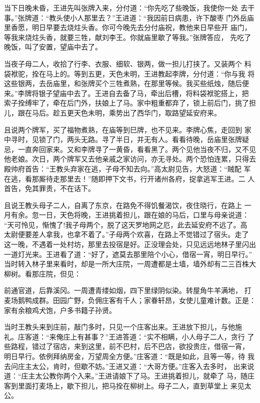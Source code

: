 当下日晚未昏，王进先叫张牌入来，分付道：“你先吃了些晚饭，我使你一处
去干事。”张牌道：“教头使小人那里去？”王进道：“我因前日病患，许下酸枣
门外岳庙里香愿，明日早要去烧炷头香。你可今晚先去分付庙祝，教他来日早些开
庙门，等我来烧炷头香，就要三牲，献刘李王。你就庙里歇了等我。”张牌答应，
先吃了晚饭，叫了安置，望庙中去了。

当夜子母二人，收拾了行李、衣服、细软、银两，做一担儿打挟了。又装两个
料袋袱驼，拴在马上的。等到五更，天色未明，王进教起李牌，分付道：“你与我
将这些银两，去岳庙里，和张牌买个三牲煮熟，在那里等候。我买些纸烛，随后便
来。”李牌将银子望庙中去了。王进自去备了马，牵出后槽，将料袋袱驼搭上，把
索子拴缚牢了，牵在后门外，扶娘上了马。家中粗重都弃了，锁上前后门，挑了担
儿，跟在马后。趁五更天色未明，乘势出了西华门，取路望延安府来。

且说两个牌军，买了福物煮熟，在庙等到巳牌，也不见来。李牌心焦，走回到
家中寻时，见锁了门，两头无路。寻了半日，并无有人。看看待晚，岳庙里张牌疑
忌，一直奔回家来。又和李牌寻了一黄昏，看看黑了。两个见他当夜不归，又不见
他老娘。次日，两个牌军又去他亲戚之家访问，亦无寻处。两个恐怕连累，只得去
殿帅府首告：“王教头弃家在逃，子母不知去向。”高太尉见告，大怒道：“贼配
军在逃，看那厮待走那里去！”随即押下文书，行开诸州各府，捉拿逃军王进。二
人首告，免其罪责，不在话下。

且说王教头母子二人，自离了东京，在路免不得饥餐渴饮，夜住晓行，在路上
一月有余。忽一日，天色将晚，王进挑着担儿，跟在娘的马后，口里与母亲说道：
“天可怜见，惭愧了!我子母两个，脱了这天罗地网之厄，此去延安府不远了。高
太尉便要差人拿我，也拿不着了。”子母两个欢喜，在路上不觉错过了宿头。走了
这一晚，不遇着一处村坊，那里去投宿是好。正没理会处，只见远远地林子里闪出
一道灯光来。王进看了道：“好了，遮莫去那里陪个小心，借宿一宵，明日早行。”
当时转入林子里来看时，却是一所大庄院，一周遭都是土墙，墙外却有二三百株大
柳树。看那庄院，但见：

前通官道，后靠溪冈。一周遭青缕如烟，四下里绿阴似染。转屋角牛羊满地，
打麦场鹅鸭成群。田园广野，负佣庄客有千人；家眷轩昂，女使儿童难计数。正是：
家有余粮鸡犬饱，户多书籍子孙贤。

当时王教头来到庄前，敲门多时，只见一个庄客出来。王进放下担儿，与他施
礼。庄客道：“来俺庄上有甚事？”王进答道：“实不相瞒，小人母子二人，贪行
了些路程，错过了宿店，来到这里，前不巴村，后不巴店，欲投贵庄，借宿一宵，
明日早行。依例拜纳房金，万望周全方便。”庄客道：“既是如此，且等一等，待
我去问庄主太公，肯时，但歇不妨。”王进又道：“大哥方便。”庄客入去多时，
出来说道：“庄主太公教你两个入来。”王进请娘下了马。王进挑着担儿，就牵了
马，随庄客到里面打麦场上，歇下担儿，把马拴在柳树上。母子二人，直到草堂上
来见太公。

